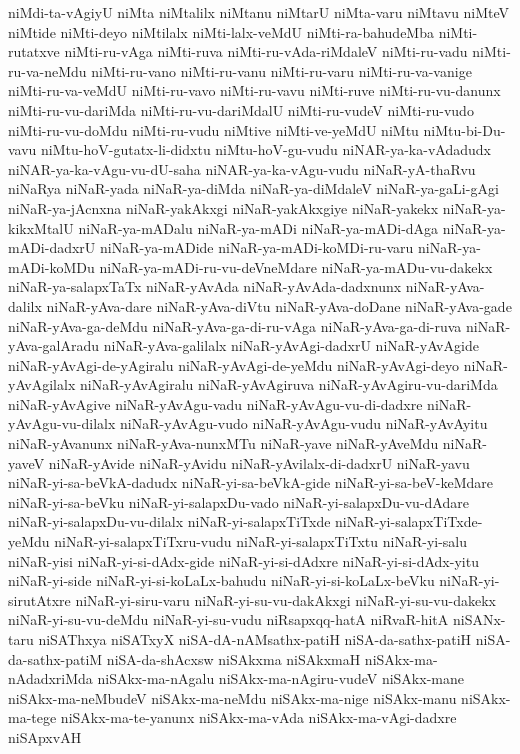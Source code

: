 {niMdi-ta-vAgiyU
niMta
niMtalilx
niMtanu
niMtarU
niMta-varu
niMtavu
niMteV
niMtide
niMti-deyo
niMtilalx
niMti-lalx-veMdU
niMti-ra-bahudeMba
niMti-rutatxve
niMti-ru-vAga
niMti-ruva
niMti-ru-vAda-riMdaleV
niMti-ru-vadu
niMti-ru-va-neMdu
niMti-ru-vano
niMti-ru-vanu
niMti-ru-varu
niMti-ru-va-vanige
niMti-ru-va-veMdU
niMti-ru-vavo
niMti-ru-vavu
niMti-ruve
niMti-ru-vu-danunx
niMti-ru-vu-dariMda
niMti-ru-vu-dariMdalU
niMti-ru-vudeV
niMti-ru-vudo
niMti-ru-vu-doMdu
niMti-ru-vudu
niMtive
niMti-ve-yeMdU
niMtu
niMtu-bi-Du-vavu
niMtu-hoV-gutatx-li-didxtu
niMtu-hoV-gu-vudu
niNAR-ya-ka-vAdadudx
niNAR-ya-ka-vAgu-vu-dU-saha
niNAR-ya-ka-vAgu-vudu
niNaR-yA-thaRvu
niNaRya
niNaR-yada
niNaR-ya-diMda
niNaR-ya-diMdaleV
niNaR-ya-gaLi-gAgi
niNaR-ya-jAcnxna
niNaR-yakAkxgi
niNaR-yakAkxgiye
niNaR-yakekx
niNaR-ya-kikxMtalU
niNaR-ya-mADalu
niNaR-ya-mADi
niNaR-ya-mADi-dAga
niNaR-ya-mADi-dadxrU
niNaR-ya-mADide
niNaR-ya-mADi-koMDi-ru-varu
niNaR-ya-mADi-koMDu
niNaR-ya-mADi-ru-vu-deVneMdare
niNaR-ya-mADu-vu-dakekx
niNaR-ya-salapxTaTx
niNaR-yAvAda
niNaR-yAvAda-dadxnunx
niNaR-yAva-dalilx
niNaR-yAva-dare
niNaR-yAva-diVtu
niNaR-yAva-doDane
niNaR-yAva-gade
niNaR-yAva-ga-deMdu
niNaR-yAva-ga-di-ru-vAga
niNaR-yAva-ga-di-ruva
niNaR-yAva-galAradu
niNaR-yAva-galilalx
niNaR-yAvAgi-dadxrU
niNaR-yAvAgide
niNaR-yAvAgi-de-yAgiralu
niNaR-yAvAgi-de-yeMdu
niNaR-yAvAgi-deyo
niNaR-yAvAgilalx
niNaR-yAvAgiralu
niNaR-yAvAgiruva
niNaR-yAvAgiru-vu-dariMda
niNaR-yAvAgive
niNaR-yAvAgu-vadu
niNaR-yAvAgu-vu-di-dadxre
niNaR-yAvAgu-vu-dilalx
niNaR-yAvAgu-vudo
niNaR-yAvAgu-vudu
niNaR-yAvAyitu
niNaR-yAvanunx
niNaR-yAva-nunxMTu
niNaR-yave
niNaR-yAveMdu
niNaR-yaveV
niNaR-yAvide
niNaR-yAvidu
niNaR-yAvilalx-di-dadxrU
niNaR-yavu
niNaR-yi-sa-beVkA-dadudx
niNaR-yi-sa-beVkA-gide
niNaR-yi-sa-beV-keMdare
niNaR-yi-sa-beVku
niNaR-yi-salapxDu-vado
niNaR-yi-salapxDu-vu-dAdare
niNaR-yi-salapxDu-vu-dilalx
niNaR-yi-salapxTiTxde
niNaR-yi-salapxTiTxde-yeMdu
niNaR-yi-salapxTiTxru-vudu
niNaR-yi-salapxTiTxtu
niNaR-yi-salu
niNaR-yisi
niNaR-yi-si-dAdx-gide
niNaR-yi-si-dAdxre
niNaR-yi-si-dAdx-yitu
niNaR-yi-side
niNaR-yi-si-koLaLx-bahudu
niNaR-yi-si-koLaLx-beVku
niNaR-yi-sirutAtxre
niNaR-yi-siru-varu
niNaR-yi-su-vu-dakAkxgi
niNaR-yi-su-vu-dakekx
niNaR-yi-su-vu-deMdu
niNaR-yi-su-vudu
niRsapxqq-hatA
niRvaR-hitA
niSANx-taru
niSAThxya
niSATxyX
niSA-dA-nAMsathx-patiH
niSA-da-sathx-patiH
niSA-da-sathx-patiM
niSA-da-shAcxsw
niSAkxma
niSAkxmaH
niSAkx-ma-nAdadxriMda
niSAkx-ma-nAgalu
niSAkx-ma-nAgiru-vudeV
niSAkx-mane
niSAkx-ma-neMbudeV
niSAkx-ma-neMdu
niSAkx-ma-nige
niSAkx-manu
niSAkx-ma-tege
niSAkx-ma-te-yanunx
niSAkx-ma-vAda
niSAkx-ma-vAgi-dadxre
niSApxvAH
}
